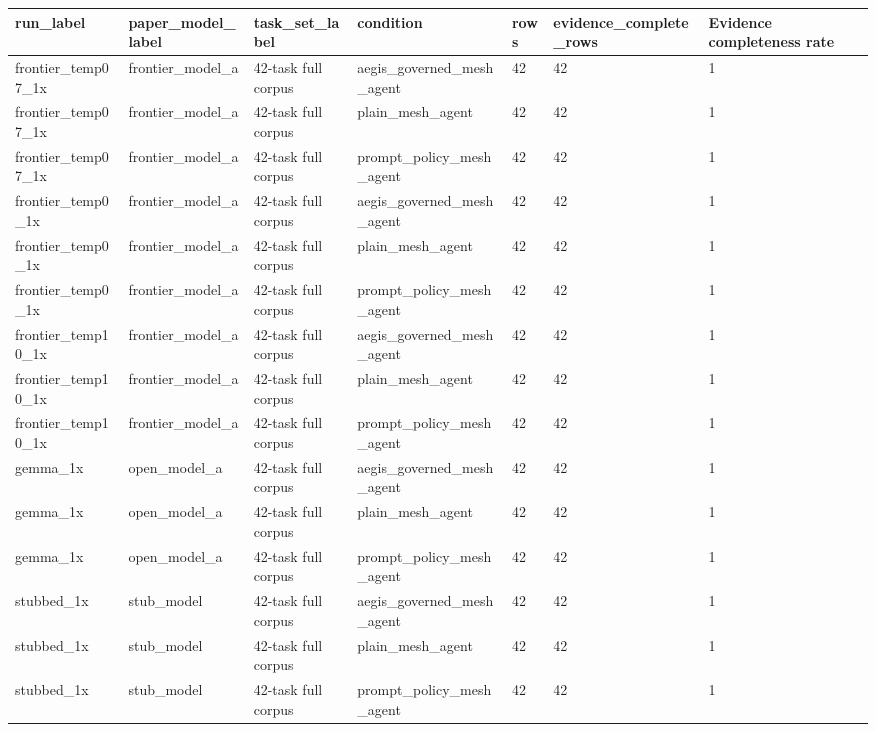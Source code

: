\begin{tabular}{lllllll}
 \hline
run\_label & paper\_model\_label & task\_set\_label & condition & rows & evidence\_complete\_rows & Evidence completeness rate \\
 \hline
frontier\_temp07\_1x & frontier\_model\_a & 42-task full corpus & aegis\_governed\_mesh\_agent & 42 & 42 & 1 \\
frontier\_temp07\_1x & frontier\_model\_a & 42-task full corpus & plain\_mesh\_agent & 42 & 42 & 1 \\
frontier\_temp07\_1x & frontier\_model\_a & 42-task full corpus & prompt\_policy\_mesh\_agent & 42 & 42 & 1 \\
frontier\_temp0\_1x & frontier\_model\_a & 42-task full corpus & aegis\_governed\_mesh\_agent & 42 & 42 & 1 \\
frontier\_temp0\_1x & frontier\_model\_a & 42-task full corpus & plain\_mesh\_agent & 42 & 42 & 1 \\
frontier\_temp0\_1x & frontier\_model\_a & 42-task full corpus & prompt\_policy\_mesh\_agent & 42 & 42 & 1 \\
frontier\_temp10\_1x & frontier\_model\_a & 42-task full corpus & aegis\_governed\_mesh\_agent & 42 & 42 & 1 \\
frontier\_temp10\_1x & frontier\_model\_a & 42-task full corpus & plain\_mesh\_agent & 42 & 42 & 1 \\
frontier\_temp10\_1x & frontier\_model\_a & 42-task full corpus & prompt\_policy\_mesh\_agent & 42 & 42 & 1 \\
gemma\_1x & open\_model\_a & 42-task full corpus & aegis\_governed\_mesh\_agent & 42 & 42 & 1 \\
gemma\_1x & open\_model\_a & 42-task full corpus & plain\_mesh\_agent & 42 & 42 & 1 \\
gemma\_1x & open\_model\_a & 42-task full corpus & prompt\_policy\_mesh\_agent & 42 & 42 & 1 \\
stubbed\_1x & stub\_model & 42-task full corpus & aegis\_governed\_mesh\_agent & 42 & 42 & 1 \\
stubbed\_1x & stub\_model & 42-task full corpus & plain\_mesh\_agent & 42 & 42 & 1 \\
stubbed\_1x & stub\_model & 42-task full corpus & prompt\_policy\_mesh\_agent & 42 & 42 & 1 \\
 \hline
\end{tabular}
